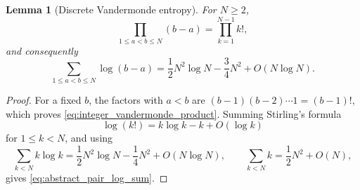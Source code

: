 \documentclass[preprint,12pt]{elsarticle}
\numberwithin{equation}{section}
\theoremstyle{plain}
\newtheorem{lemma}[theorem]{Lemma}
\theoremstyle{definition}
\theoremstyle{remark}
\begin{document}
\begin{lemma}[Discrete Vandermonde entropy]
\label{lem:discrete_vandermonde_entropy}
For \(N\ge2\),
\begin{equation}
\prod_{1\le a<b\le N}(b-a)=\prod_{k=1}^{N-1}k!,
\label{eq:integer_vandermonde_product}
\end{equation}
and consequently
\begin{equation}
\sum_{1\le a<b\le N}\log(b-a)
=
\frac12N^2\log N-\frac34N^2+O(N\log N).
\label{eq:abstract_pair_log_sum}
\end{equation}
\end{lemma}

\begin{proof}
For a fixed \(b\), the factors with \(a<b\) are
\((b-1)(b-2)\cdots1=(b-1)!\), which proves
\eqref{eq:integer_vandermonde_product}.  Summing Stirling's formula
\[
\log(k!)=k\log k-k+O(\log k)
\]
for \(1\le k<N\), and using
\[
\sum_{k<N}k\log k
=\frac12N^2\log N-\frac14N^2+O(N\log N),
\qquad
\sum_{k<N}k=\frac12N^2+O(N),
\]
gives \eqref{eq:abstract_pair_log_sum}.
\end{proof}
\end{document}
